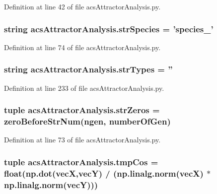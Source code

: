 Definition at line 42 of file acs\-Attractor\-Analysis.\-py.

\hypertarget{a00090_aa76707ba3058ba96fc8e5aeafa461193}{
\subsubsection[{str\-Species}]{\setlength{\rightskip}{0pt plus 5cm}string acs\-Attractor\-Analysis.\-str\-Species = 'species\-\_\-'}}\label{a00090_aa76707ba3058ba96fc8e5aeafa461193}


Definition at line 74 of file acs\-Attractor\-Analysis.\-py.

\hypertarget{a00090_ae5f324ca114055fca79473eecd17bb80}{
\subsubsection[{str\-Types}]{\setlength{\rightskip}{0pt plus 5cm}string acs\-Attractor\-Analysis.\-str\-Types = ''}}\label{a00090_ae5f324ca114055fca79473eecd17bb80}


Definition at line 233 of file acs\-Attractor\-Analysis.\-py.

\hypertarget{a00090_a5708d1d44920d75a918ec1c988c02c57}{
\subsubsection[{str\-Zeros}]{\setlength{\rightskip}{0pt plus 5cm}tuple acs\-Attractor\-Analysis.\-str\-Zeros = {\bf zero\-Before\-Str\-Num}(ngen, {\bf number\-Of\-Gen})}}\label{a00090_a5708d1d44920d75a918ec1c988c02c57}


Definition at line 73 of file acs\-Attractor\-Analysis.\-py.

\hypertarget{a00090_a305669433b259c5ffcb797769e7c30df}{
\subsubsection[{tmp\-Cos}]{\setlength{\rightskip}{0pt plus 5cm}tuple acs\-Attractor\-Analysis.\-tmp\-Cos = float(np.\-dot({\bf vec\-X},{\bf vec\-Y}) / (np.\-linalg.\-norm({\bf vec\-X}) $\ast$ np.\-linalg.\-norm({\bf vec\-Y})))}}\label{a00090_a305669433b259c5ffcb797769e7c30df}


